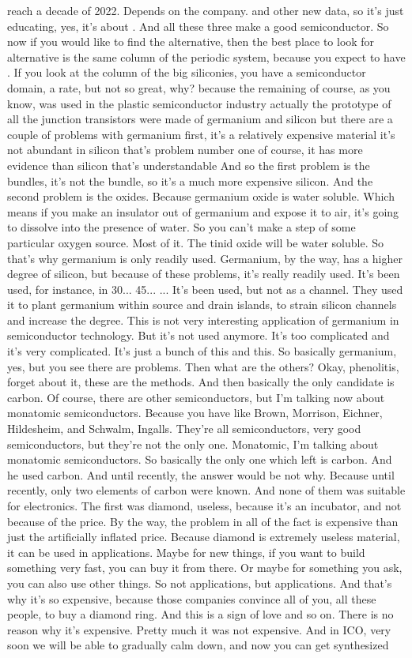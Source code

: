 reach a decade of 2022. Depends on the company. and other new data, so it's just educating, yes, it's about . And all these three make a good semiconductor. So now if you would like to find the alternative, then the best place to look for alternative is the same column of the periodic system, because you expect to have . If you look at the column of the big siliconies, you have a semiconductor domain, a rate, but not so great, why? because the remaining of course, as you know, was used in the plastic semiconductor industry actually the prototype of all the junction transistors were made of germanium and silicon but there are a couple of problems with germanium first, it's a relatively expensive material it's not abundant in silicon that's problem number one of course, it has more evidence than silicon that's understandable And so the first problem is the bundles, it's not the bundle, so it's a much more expensive silicon. And the second problem is the oxides. Because germanium oxide is water soluble. Which means if you make an insulator out of germanium and expose it to air, it's going to dissolve into the presence of water. So you can't make a step of some particular oxygen source. Most of it. The tinid oxide will be water soluble. So that's why germanium is only readily used. Germanium, by the way, has a higher degree of silicon, but because of these problems, it's really readily used. It's been used, for instance, in 30... 45... ... It's been used, but not as a channel. They used it to plant germanium within source and drain islands, to strain silicon channels and increase the degree. This is not very interesting application of germanium in semiconductor technology. But it's not used anymore. It's too complicated and it's very complicated. It's just a bunch of this and this. So basically germanium, yes, but you see there are problems. Then what are the others? Okay, phenolitis, forget about it, these are the methods. And then basically the only candidate is carbon. Of course, there are other semiconductors, but I'm talking now about monatomic semiconductors. Because you have like Brown, Morrison, Eichner, Hildesheim, and Schwalm, Ingalls. They're all semiconductors, very good semiconductors, but they're not the only one. Monatomic, I'm talking about monatomic semiconductors. So basically the only one which left is carbon. And he used carbon. And until recently, the answer would be not why. Because until recently, only two elements of carbon were known. And none of them was suitable for electronics. The first was diamond, useless, because it's an incubator, and not because of the price. By the way, the problem in all of the fact is expensive than just the artificially inflated price. Because diamond is extremely useless material, it can be used in applications. Maybe for new things, if you want to build something very fast, you can buy it from there. Or maybe for something you ask, you can also use other things. So not applications, but applications. And that's why it's so expensive, because those companies convince all of you, all these people, to buy a diamond ring. And this is a sign of love and so on. There is no reason why it's expensive. Pretty much it was not expensive. And in ICO, very soon we will be able to gradually calm down, and now you can get synthesized 